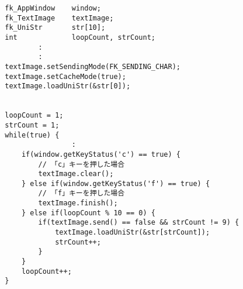 \begin{breakbox}
\begin{verbatim}
        fk_AppWindow    window;
        fk_TextImage    textImage;
        fk_UniStr       str[10];
        int             loopCount, strCount;
                :
                :
        textImage.setSendingMode(FK_SENDING_CHAR);
        textImage.setCacheMode(true);
        textImage.loadUniStr(&str[0]);


        loopCount = 1;
        strCount = 1;
        while(true) {
                        :
            if(window.getKeyStatus('c') == true) {
                // 「c」キーを押した場合
                textImage.clear();
            } else if(window.getKeyStatus('f') == true) {
                // 「f」キーを押した場合
                textImage.finish();
            } else if(loopCount % 10 == 0) {
                if(textImage.send() == false && strCount != 9) {
                    textImage.loadUniStr(&str[strCount]);
                    strCount++;
                }
            }
            loopCount++;
        }
\end{verbatim}
\end{breakbox}
